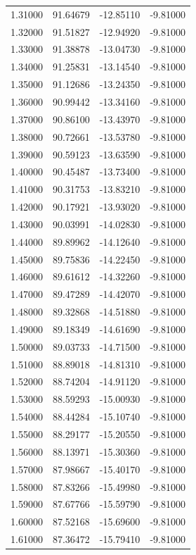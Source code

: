 \begin{table}
\begin{tabular}{llll}
1.31000 & 91.64679 & -12.85110 & -9.81000 \\
1.32000 & 91.51827 & -12.94920 & -9.81000 \\
1.33000 & 91.38878 & -13.04730 & -9.81000 \\
1.34000 & 91.25831 & -13.14540 & -9.81000 \\
1.35000 & 91.12686 & -13.24350 & -9.81000 \\
1.36000 & 90.99442 & -13.34160 & -9.81000 \\
1.37000 & 90.86100 & -13.43970 & -9.81000 \\
1.38000 & 90.72661 & -13.53780 & -9.81000 \\
1.39000 & 90.59123 & -13.63590 & -9.81000 \\
1.40000 & 90.45487 & -13.73400 & -9.81000 \\
1.41000 & 90.31753 & -13.83210 & -9.81000 \\
1.42000 & 90.17921 & -13.93020 & -9.81000 \\
1.43000 & 90.03991 & -14.02830 & -9.81000 \\
1.44000 & 89.89962 & -14.12640 & -9.81000 \\
1.45000 & 89.75836 & -14.22450 & -9.81000 \\
1.46000 & 89.61612 & -14.32260 & -9.81000 \\
1.47000 & 89.47289 & -14.42070 & -9.81000 \\
1.48000 & 89.32868 & -14.51880 & -9.81000 \\
1.49000 & 89.18349 & -14.61690 & -9.81000 \\
1.50000 & 89.03733 & -14.71500 & -9.81000 \\
1.51000 & 88.89018 & -14.81310 & -9.81000 \\
1.52000 & 88.74204 & -14.91120 & -9.81000 \\
1.53000 & 88.59293 & -15.00930 & -9.81000 \\
1.54000 & 88.44284 & -15.10740 & -9.81000 \\
1.55000 & 88.29177 & -15.20550 & -9.81000 \\
1.56000 & 88.13971 & -15.30360 & -9.81000 \\
1.57000 & 87.98667 & -15.40170 & -9.81000 \\
1.58000 & 87.83266 & -15.49980 & -9.81000 \\
1.59000 & 87.67766 & -15.59790 & -9.81000 \\
1.60000 & 87.52168 & -15.69600 & -9.81000 \\
1.61000 & 87.36472 & -15.79410 & -9.81000 \\

\end{tabular}
\end{table}
